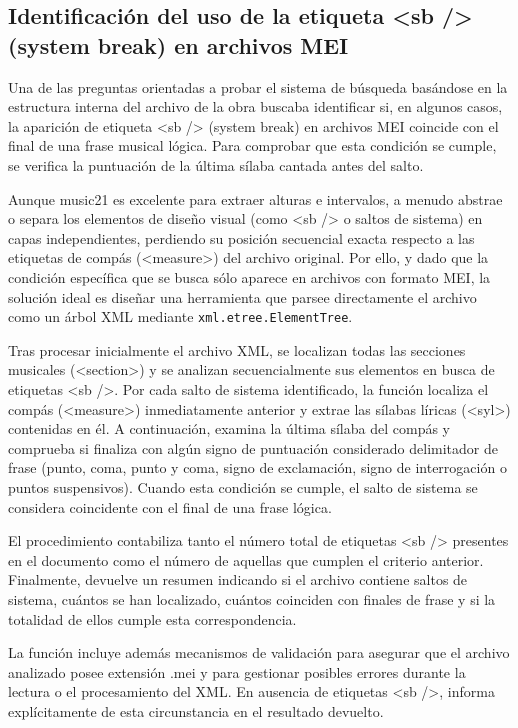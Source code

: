 \subsection{Identificación del uso de la etiqueta <sb /> (system break) en archivos MEI}
Una de las preguntas orientadas a probar el sistema de búsqueda basándose en la estructura interna del archivo de la obra buscaba identificar si, en algunos casos, la aparición de etiqueta <sb /> (system break) en archivos MEI coincide con el final de una frase musical lógica. Para comprobar que esta condición se cumple, se verifica la puntuación de la última sílaba cantada antes del salto.

Aunque music21 es excelente para extraer alturas e intervalos, a menudo abstrae o separa los elementos de diseño visual (como <sb /> o saltos de sistema) en capas independientes, perdiendo su posición secuencial exacta respecto a las etiquetas de compás (<measure>) del archivo original.
Por ello, y dado que la condición específica que se busca sólo aparece en archivos con formato MEI, la solución ideal es diseñar una herramienta que parsee directamente el archivo como un árbol XML mediante \verb|xml.etree.ElementTree|.

Tras procesar inicialmente el archivo XML, se localizan todas las secciones musicales (<section>) y se analizan secuencialmente sus elementos en busca de etiquetas <sb />. Por cada salto de sistema identificado, la función localiza el compás (<measure>) inmediatamente anterior y extrae las sílabas líricas (<syl>) contenidas en él. A continuación, examina la última sílaba del compás y comprueba si finaliza con algún signo de puntuación considerado delimitador de frase (punto, coma, punto y coma, signo de exclamación, signo de interrogación o puntos suspensivos). Cuando esta condición se cumple, el salto de sistema se considera coincidente con el final de una frase lógica.

El procedimiento contabiliza tanto el número total de etiquetas <sb /> presentes en el documento como el número de aquellas que cumplen el criterio anterior. Finalmente, devuelve un resumen indicando si el archivo contiene saltos de sistema, cuántos se han localizado, cuántos coinciden con finales de frase y si la totalidad de ellos cumple esta correspondencia.

La función incluye además mecanismos de validación para asegurar que el archivo analizado posee extensión .mei y para gestionar posibles errores durante la lectura o el procesamiento del XML. En ausencia de etiquetas <sb />, informa explícitamente de esta circunstancia en el resultado devuelto.

